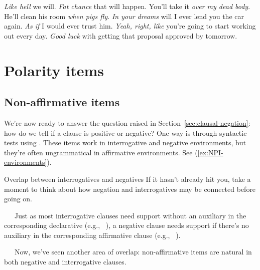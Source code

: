 \ea \label{ex:ironic-neg}
    \ea \emph{Like hell} we will.
    \ex \emph{Fat chance} that will happen.
    \ex You'll take it \emph{over my dead body}.
    \ex He'll clean his room \emph{when pigs fly}.
    \ex \emph{In your dreams} will I ever lend you the car again.
    \ex \emph{As if} I would ever trust him.
    \ex \emph{Yeah, right, like} you're going to start working out every day.
    \ex \emph{Good luck} with getting that proposal approved by tomorrow.
    \z
\z

\section{Polarity items} \label{sec:polarity-items}

\subsection{Non-affirmative items}

We're now ready to answer the question raised in Section~\ref{sec:clausal-negation}: how do we tell if a clause is positive or negative? One way is through syntactic tests using . These items work in interrogative and negative environments, but they're often ungrammatical in affirmative environments. See (\ref{ex:NPI-environments}).

\ea \label{ex:NPI-environments}
    \ea
         \label{ex:at-all-interrogative}
         \label{ex:at-all-neg}
         \label{ex:at-all-pos}
        \z
    \ex
         \label{ex:ever-interrogative}
         \label{ex:ever-neg}
         \label{ex:ever-pos}
        \z
    \ex
         \label{ex:yet-interrogative}
         \label{ex:yet-neg}
         \label{ex:yet-pos}
        \z
    \z
\z

\begin{tblsframed}{Overlap between interrogatives and negatives}
    If it hasn't already hit you, take a moment to think about how negation and interrogatives may be connected before going on.

    ~~~Just as most interrogative clauses need  support without an auxiliary in the corresponding declarative (e.g.,  \rightarrow ~), a negative clause needs  support if there's no auxiliary in the corresponding affirmative clause (e.g.,  \rightarrow ~).

    ~~~Now, we've seen another area of overlap: non-affirmative items are natural in both negative and interrogative clauses.
\end{tblsframed}

